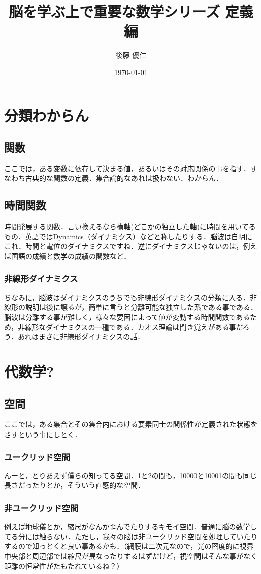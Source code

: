 \documentclass[11pt,a4paper]{jreport}
\title{脳を学ぶ上で重要な数学シリーズ 定義編}
\author{後藤 優仁}
\date{\today}
\begin{document}
\maketitle
%
%
\tableofcontents

\chapter{分類わからん}
\section{関数}
ここでは，ある変数に依存して決まる値，あるいはその対応関係の事を指す．すなわち古典的な関数の定義．集合論的なあれは扱わない．わからん．
\section{時間関数}
時間発展する関数．言い換えるなら横軸(どこかの独立した軸)に時間を用いてるもの．英語ではDynamics（ダイナミクス）などと称したりする．脳波は自明にこれ．時間と電位のダイナミクスですね．逆にダイナミクスじゃないのは，例えば国語の成績と数学の成績の関数など．
\subsection{非線形ダイナミクス}
ちなみに，脳波はダイナミクスのうちでも非線形ダイナミクスの分類に入る．非線形の説明は後に譲るが，簡単に言うと分離可能な独立した系である事である．脳波は分離する事が難しく，様々な要因によって値が変動する時間関数であるため，非線形なダイナミクスの一種である．カオス理論は聞き覚えがある事だろう．あれはまさに非線形ダイナミクスの話．

\chapter{代数学?}
\section{空間}
ここでは，ある集合とその集合内における要素同士の関係性が定義された状態をさすという事にしとく．
\subsection{ユークリッド空間}
んーと，とりあえず僕らの知ってる空間．1と2の間も，10000と10001の間も同じ長さだったりとか，そういう直感的な空間．
\subsection{非ユークリッド空間}
例えば地球儀とか，縮尺がなんか歪んでたりするキモイ空間．普通に脳の数学してる分には触らない．ただし，我々の脳は非ユークリッド空間を処理していたりするので知っとくと良い事あるかも．（網膜は二次元なので，光の密度的に視界中央部と周辺部では縮尺が異なったりするはずだけど，視空間はそんな事がなく距離の恒常性がたもたれているね？）
\end{document}
